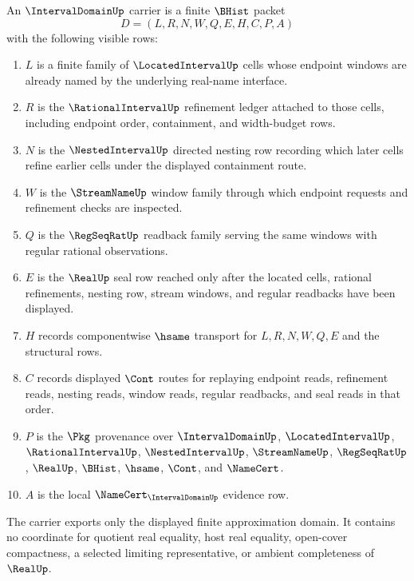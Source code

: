 \begin{definition}
\label{def:interval-domain-carrier}
An $\IntervalDomainUp$ carrier is a finite $\BHist$ packet
$$
D=(L,R,N,W,Q,E,H,C,P,A)
$$
with the following visible rows:
\begin{enumerate}
\item $L$ is a finite family of $\LocatedIntervalUp$ cells whose endpoint windows are already named by the underlying real-name interface.
\item $R$ is the $\RationalIntervalUp$ refinement ledger attached to those cells, including endpoint order, containment, and width-budget rows.
\item $N$ is the $\NestedIntervalUp$ directed nesting row recording which later cells refine earlier cells under the displayed containment route.
\item $W$ is the $\StreamNameUp$ window family through which endpoint requests and refinement checks are inspected.
\item $Q$ is the $\RegSeqRatUp$ readback family serving the same windows with regular rational observations.
\item $E$ is the $\RealUp$ seal row reached only after the located cells, rational refinements, nesting row, stream windows, and regular readbacks have been displayed.
\item $H$ records componentwise $\hsame$ transport for $L,R,N,W,Q,E$ and the structural rows.
\item $C$ records displayed $\Cont$ routes for replaying endpoint reads, refinement reads, nesting reads, window reads, regular readbacks, and seal reads in that order.
\item $P$ is the $\Pkg$ provenance over $\IntervalDomainUp$, $\LocatedIntervalUp$, $\RationalIntervalUp$, $\NestedIntervalUp$, $\StreamNameUp$, $\RegSeqRatUp$, $\RealUp$, $\BHist$, $\hsame$, $\Cont$, and $\NameCert$.
\item $A$ is the local $\NameCert_{\IntervalDomainUp}$ evidence row.
\end{enumerate}
The carrier exports only the displayed finite approximation domain. It contains no coordinate for quotient real equality, host real equality, open-cover compactness, a selected limiting representative, or ambient completeness of $\RealUp$.
\end{definition}

